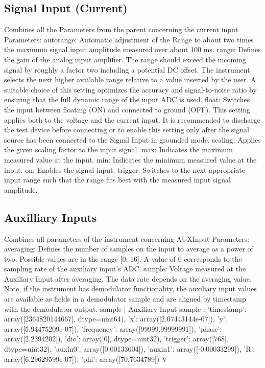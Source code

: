 \documentclass[11pt]{article} %
\begin{document}
\subsection{Signal Input (Current)}
    Combines all the Parameters from the parent concerning the current input
    Parameters: 
            autorange: Automatic adjustment of the Range to about two times the maximum 
                signal input amplitude measured over about 100 ms.
            range: Defines the gain of the analog input amplifier. The range should 
                exceed the incoming signal by roughly a factor two including a 
                potential DC offset. The instrument selects the next higher available
                range relative to a value inserted by the user. A suitable choice of
                this setting optimizes the accuracy and signal-to-noise ratio by 
                ensuring that the full dynamic range of the input ADC is used.
            float: Switches the input between floating (ON) and connected to ground (OFF). 
                This setting applies both to the voltage and the current input. It
                is recommended to discharge the test device before connecting or to
                enable this setting only after the signal source has been connected
                to the Signal Input in grounded mode.
            scaling: Applies the given scaling factor to the input signal.
            max: Indicates the maximum measured value at the input.
            min: Indicates the minimum measured value at the input.
            on: Enables the signal input.
            trigger: Switches to the next appropriate input range such that the range 
                fits best with the measured input signal amplitude.


\subsection{Auxilliary Inputs}
    Combines all parameters of the instrument concerning AUXInput
    Parameters:
            averaging: Defines the number of samples on the input to average as 
                a power of two. Possible values are in the range [0, 16]. A value 
                of 0 corresponds to the sampling rate of the auxiliary input's ADC.
            sample: Voltage measured at the Auxiliary Input after averaging. 
                The data rate depends on the averaging value. Note, if the instrument
                has demodulator functionality, the auxiliary input values are
                available as fields in a demodulator sample and are aligned by 
                timestamp with the demodulator output.
sample  |  Auxiliary Input sample :  {'timestamp': array([2364820144667], dtype=uint64), 'x': array([2.07443144e-07]), 'y': array([5.94475209e-07]), 'frequency': array([99999.99999991]), 'phase': array([2.2394202]), 'dio': array([0], dtype=uint32), 'trigger': array([768], dtype=uint32), 'auxin0': array([0.00133604]), 'auxin1': array([-0.00033299]), 'R': array([6.29629599e-07]), 'phi': array([70.7634789])} V
\end{document}
